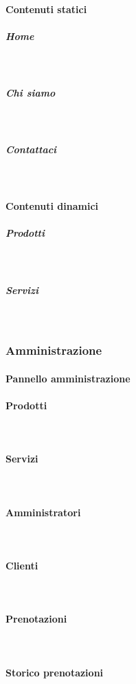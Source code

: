 \paragraph{Contenuti statici}
\subparagraph{Home}
~\\
\subparagraph{Chi siamo}
~\\
\subparagraph{Contattaci}
~\\

\paragraph{Contenuti dinamici}
\subparagraph{Prodotti} 
~\\

\subparagraph{Servizi} 
~\\

\subsubsection{Amministrazione}

\paragraph{Pannello amministrazione} 
\paragraph{Prodotti}
~\\
\paragraph{Servizi}
~\\
\paragraph{Amministratori}
~\\
\paragraph{Clienti}
~\\

\paragraph{Prenotazioni}
~\\

\paragraph{Storico prenotazioni}
~\\










